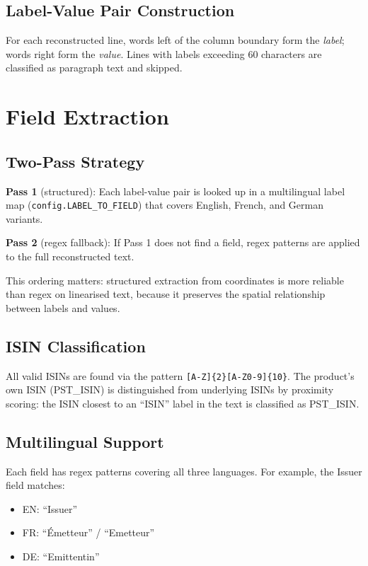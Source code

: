 \documentclass[11pt,a4paper]{article}
\begin{document}
\subsection{Label-Value Pair Construction}

For each reconstructed line, words left of the column boundary form the
\textit{label}; words right form the \textit{value}. Lines with labels
exceeding 60 characters are classified as paragraph text and skipped.

\section{Field Extraction}

\subsection{Two-Pass Strategy}

\textbf{Pass 1} (structured): Each label-value pair is looked up in a
multilingual label map (\texttt{config.LABEL\_TO\_FIELD}) that covers
English, French, and German variants.

\textbf{Pass 2} (regex fallback): If Pass 1 does not find a field, regex
patterns are applied to the full reconstructed text.

This ordering matters: structured extraction from coordinates is more
reliable than regex on linearised text, because it preserves the spatial
relationship between labels and values.

\subsection{ISIN Classification}

All valid ISINs are found via the pattern \texttt{[A-Z]\{2\}[A-Z0-9]\{10\}}.
The product's own ISIN (PST\_ISIN) is distinguished from underlying ISINs
by proximity scoring: the ISIN closest to an ``ISIN'' label in the text
is classified as PST\_ISIN.

\subsection{Multilingual Support}

Each field has regex patterns covering all three languages. For example,
the Issuer field matches:
\begin{itemize}
  \item EN: ``Issuer''
  \item FR: ``\'Emetteur'' / ``Emetteur''
  \item DE: ``Emittentin''
\end{itemize}
\end{document}

